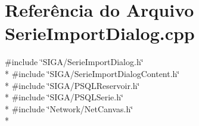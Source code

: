 \section{Referência do Arquivo Serie\+Import\+Dialog.\+cpp}
\label{_serie_import_dialog_8cpp}
{\ttfamily \#include \char`\"{}S\+I\+G\+A/\+Serie\+Import\+Dialog.\+h\char`\"{}}\\*
{\ttfamily \#include \char`\"{}S\+I\+G\+A/\+Serie\+Import\+Dialog\+Content.\+h\char`\"{}}\\*
{\ttfamily \#include \char`\"{}S\+I\+G\+A/\+P\+S\+Q\+L\+Reservoir.\+h\char`\"{}}\\*
{\ttfamily \#include \char`\"{}S\+I\+G\+A/\+P\+S\+Q\+L\+Serie.\+h\char`\"{}}\\*
{\ttfamily \#include \char`\"{}Network/\+Net\+Canvas.\+h\char`\"{}}\\*
